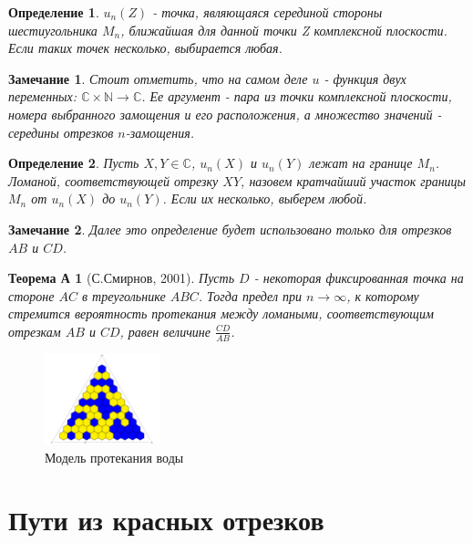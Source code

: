 \documentclass[russian,12pt]{article}
\newtheorem*{theorem*}{Теорема А}
\newtheorem{definition}{Определение}
\newtheorem{note}{Замечание}
\begin{document}
\begin{definition}
$u_n(Z)$ - точка, являющаяся серединой стороны шестиугольника $M_n$, ближайшая для данной точки Z комплексной плоскости. Если таких точек несколько, выбирается любая.
\end{definition}
\begin{note}
Стоит отметить, что на самом деле $u$ - функция двух переменных: $\mathbb{C} \times \mathbb{N} \rightarrow \mathbb{C}$. Ее аргумент - пара из точки комплексной плоскости, номера выбранного замощения и его расположения, а множество значений - середины отрезков $n$-замощения. 
\end{note}

\begin{definition}\label{lomanaya}
Пусть $X, Y \in \mathbb{C}$,  $u_n(X)$ и $u_n(Y)$ лежат на границе $M_n$. Ломаной, соответствующей отрезку $XY$, назовем кратчайший участок границы $M_n$ от $u_n(X)$ до $u_n(Y)$. Если их несколько, выберем любой.
\end{definition}
\begin{note}
Далее это определение будет использовано только для отрезков $AB$ и $CD$.
\end{note}
\smallskip
\begin{theorem*}[С.Смирнов, 2001]\label{main-theorem}
Пусть $D$ - некоторая фиксированная точка на стороне $AC$ в треугольнике $ABC$. Тогда предел при $n \to \infty$, к которому стремится вероятность протекания между ломаными, соответствующим отрезкам $AB$ и $CD$, равен величине $\frac{CD}{AB}$.
\end{theorem*}
\smallskip

\begin{figure}[!ht]
\begin{center}
  \vspace{-0.3cm}
  \includegraphics[width=0.3\textwidth]{triangle-v4.png}
  \vspace{-0.9cm}
\end{center}
  \caption{Модель протекания воды}
  \label{fig-simulation}
  \vspace{-1cm}
\end{figure}
\bigskip
\section*{Пути из красных отрезков}
\end{document}
